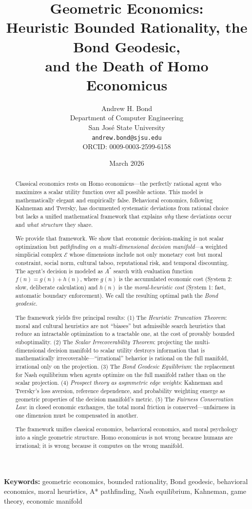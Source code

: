 \documentclass[12pt]{article}
\title{\textbf{Geometric Economics:\\Heuristic Bounded Rationality, the Bond Geodesic,\\and the Death of Homo Economicus}}
\author{Andrew H. Bond\\
Department of Computer Engineering\\
San Jos\'{e} State University\\
\texttt{andrew.bond@sjsu.edu}\\
ORCID: 0009-0003-2599-6158}
\date{March 2026}
\theoremstyle{definition}
\theoremstyle{remark}
\newcommand{\E}{\mathcal{E}}               %
\begin{document}
\maketitle

\noindent\textbf{Keywords:} geometric economics, bounded rationality, Bond geodesic, behavioral economics, moral heuristics, A* pathfinding, Nash equilibrium, Kahneman, game theory, economic manifold

\begin{abstract}
Classical economics rests on Homo economicus---the perfectly rational agent who maximizes a scalar utility function over all possible actions.  This model is mathematically elegant and empirically false.  Behavioral economics, following Kahneman and Tversky, has documented systematic deviations from rational choice but lacks a unified mathematical framework that explains \emph{why} these deviations occur and \emph{what structure} they share.

We provide that framework.  We show that economic decision-making is not scalar optimization but \emph{pathfinding on a multi-dimensional decision manifold}---a weighted simplicial complex $\E$ whose dimensions include not only monetary cost but moral constraint, social norm, cultural taboo, reputational risk, and temporal discounting.  The agent's decision is modeled as $A^*$ search with evaluation function $f(n) = g(n) + h(n)$, where $g(n)$ is the accumulated economic cost (System 2: slow, deliberate calculation) and $h(n)$ is the \emph{moral-heuristic cost} (System 1: fast, automatic boundary enforcement).  We call the resulting optimal path the \emph{Bond geodesic}.

The framework yields five principal results:  (1) The \emph{Heuristic Truncation Theorem}: moral and cultural heuristics are not ``biases'' but admissible search heuristics that reduce an intractable optimization to a tractable one, at the cost of provably bounded suboptimality.  (2) The \emph{Scalar Irrecoverability Theorem}: projecting the multi-dimensional decision manifold to scalar utility destroys information that is mathematically irrecoverable---``irrational'' behavior is rational on the full manifold, irrational only on the projection.  (3) The \emph{Bond Geodesic Equilibrium}: the replacement for Nash equilibrium when agents optimize on the full manifold rather than on the scalar projection.  (4) \emph{Prospect theory as asymmetric edge weights}: Kahneman and Tversky's loss aversion, reference dependence, and probability weighting emerge as geometric properties of the decision manifold's metric.  (5) The \emph{Fairness Conservation Law}: in closed economic exchanges, the total moral friction is conserved---unfairness in one dimension must be compensated in another.

The framework unifies classical economics, behavioral economics, and moral psychology into a single geometric structure.  Homo economicus is not wrong because humans are irrational; it is wrong because it computes on the wrong manifold.
\end{abstract}
\end{document}
